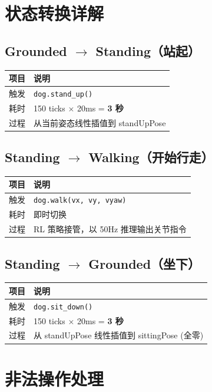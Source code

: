 \documentclass[a4paper,11pt,openany]{book}
\begin{document}
\section{状态转换详解}

\subsection{Grounded $\to$ Standing（站起）}

\begin{longtable}{ll}
\toprule
项目 & 说明 \\
\midrule
\endhead
触发 & \texttt{dog.stand\_up()} \\
耗时 & 150 ticks $\times$ 20ms = \textbf{3 秒} \\
过程 & 从当前姿态线性插值到 standUpPose \\
\bottomrule
\end{longtable}

\subsection{Standing $\to$ Walking（开始行走）}

\begin{longtable}{ll}
\toprule
项目 & 说明 \\
\midrule
\endhead
触发 & \texttt{dog.walk(vx, vy, vyaw)} \\
耗时 & 即时切换 \\
过程 & RL 策略接管，以 50Hz 推理输出关节指令 \\
\bottomrule
\end{longtable}

\subsection{Standing $\to$ Grounded（坐下）}

\begin{longtable}{ll}
\toprule
项目 & 说明 \\
\midrule
\endhead
触发 & \texttt{dog.sit\_down()} \\
耗时 & 150 ticks $\times$ 20ms = \textbf{3 秒} \\
过程 & 从 standUpPose 线性插值到 sittingPose (全零) \\
\bottomrule
\end{longtable}

\section{非法操作处理}
\end{document}

